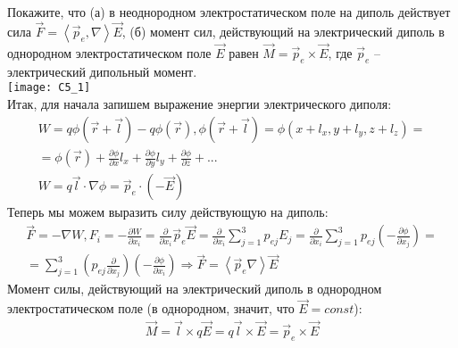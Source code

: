 \documentclass[__main__.tex]{subfiles}
\begin{document}
Покажите, что (а) в неоднородном электростатическом поле на диполь действует сила $\vec{F}=\left<\vec{p}_e,\nabla\right>\vec{E}$, (б) момент сил, действующий на электрический диполь в однородном электростатическом поле $\vec{E}$ равен $\vec{M}=\vec{p}_e\times\vec{E}$, где $\vec{p}_e$ -- электрический дипольный момент.\\ 
\texttt{[image: C5\_1]}\\
Итак, для начала запишем выражение энергии электрического диполя:\\
\begin{gather}
W = q\phi(\vec{r}+\vec{l})-q\phi(\vec{r}), \phi(\vec{r}+\vec{l}) = \phi(x+l_x,y+l_y,z+l_z)=\\
=\phi(\vec{r})+\frac{\partial \phi}{\partial x}l_x+\frac{\partial \phi}{\partial y}l_y+\frac{\partial \phi}{\partial z}+...\\
W = q\vec{l} \cdot \nabla \phi = \vec{p}_{e} \cdot (-\vec{E})
\end{gather}
Теперь мы можем выразить силу действующую на диполь:\\
\begin{gather}
\vec{F} = -\nabla W, F_i = -\frac{\partial W}{\partial x_i} = \frac{\partial}{\partial x_i}\vec{p}_{e}\vec{E}=\frac{\partial}{\partial x_i}\sum_{j=1}^{3}p_{ej}E_j = \frac{\partial}{\partial x_i} \sum_{j=1}^{3}p_{ej}\left(-\frac{\partial \phi}{\partial x_j}\right) = \\ = \sum_{j=1}^{3}\left(p_{ej}\frac{\partial}{\partial x_j}\right)\left(-\frac{\partial \phi}{\partial x_i}\right) \Longrightarrow \vec{F} = \left<\vec{p}_{e}\nabla\right>\vec{E}
\end{gather}
Момент силы, действующий на электрический диполь в однородном электростатическом поле (в однородном, значит, что $\vec{E} = const$):
\begin{gather}
\vec{M} = \vec{l} \times q\vec{E} = q\vec{l}\times\vec{E} = \vec{p}_{e}\times\vec{E}
\end{gather}
\end{document}
